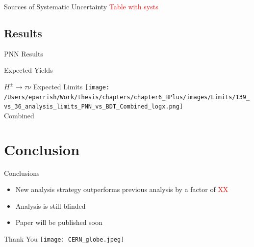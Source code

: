 \documentclass[aspectratio=169,xcolor=table]{beamer}
\begin{document}
    \begin{frame}[t]{Sources of Systematic Uncertainty}
      \textcolor{red}{Table with systs}
    \end{frame}

  \subsection{Results }

    \begin{frame}[t]{PNN Results}

    \end{frame}

    \begin{frame}[t]{Expected Yields}

    \end{frame}

    \begin{frame}{$H^{\pm} \rightarrow \tau\nu$ Expected Limits}
      \centering
      \texttt{[image: /Users/eparrish/Work/thesis/chapters/chapter6\_HPlus/images/Limits/139\_vs\_36\_analysis\_limits\_PNN\_vs\_BDT\_Combined\_logx.png]} \\
      \centering
      Combined
    \end{frame}

\section{Conclusion }

  \begin{frame}[t]{Conclusions}
    \begin{itemize}
      \item New analysis strategy outperforms previous analysis by a factor of \textcolor{red}{XX}
      \item Analysis is still blinded
      \item Paper will be published soon
    \end{itemize}
  \end{frame}

  \begin{frame}{Thank You}
    \centering
    \texttt{[image: CERN\_globe.jpeg]}
  \end{frame}


\appendix
\end{document}
